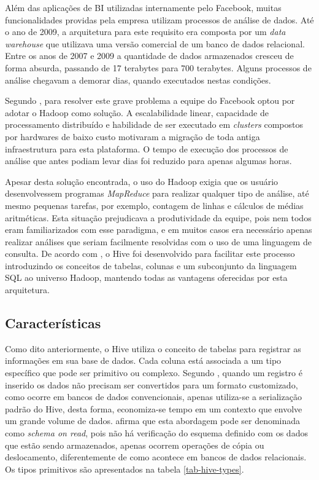 Além das aplicações de BI utilizadas internamente pelo Facebook, muitas funcionalidades providas pela empresa utilizam processos de análise de dados. Até o ano de 2009, a arquitetura para este requisito era composta por um \textit{data warehouse} que utilizava uma versão comercial de um banco de dados relacional. Entre os anos de 2007 e 2009 a quantidade de dados armazenados cresceu de forma absurda, passando de 17 terabytes para 700 terabytes. Alguns processos de análise chegavam a demorar dias, quando executados nestas condições.

Segundo , para resolver este grave problema a equipe do Facebook optou por adotar o Hadoop como solução. A escalabilidade linear, capacidade de processamento distribuído e habilidade de ser executado em \textit{clusters} compostos por hardwares de baixo custo motivaram a migração de toda antiga infraestrutura para esta plataforma. O tempo de execução dos processos de análise que antes podiam levar dias foi reduzido para apenas algumas horas.

Apesar desta solução encontrada, o uso do Hadoop exigia que os usuário desenvolvessem programas \textit{MapReduce} para realizar qualquer tipo de análise, até mesmo pequenas tarefas, por exemplo, contagem de linhas e cálculos de médias aritméticas. Esta situação prejudicava a produtividade da equipe, pois nem todos eram familiarizados com esse paradigma, e em muitos casos era necessário apenas realizar análises que seriam facilmente resolvidas com o uso de uma linguagem de consulta. De acordo com , o Hive foi desenvolvido para facilitar este processo introduzindo os conceitos de tabelas, colunas e um subconjunto da linguagem SQL ao universo Hadoop, mantendo todas as vantagens oferecidas por esta arquitetura.

\subsection{Características}

Como dito anteriormente, o Hive utiliza o conceito de tabelas para registrar as informações em sua base de dados. Cada coluna está associada a um tipo específico que pode ser primitivo ou complexo. Segundo , quando um registro é inserido os dados não precisam ser convertidos para um formato customizado, como ocorre em bancos de dados convencionais, apenas utiliza-se a serialização padrão do Hive, desta forma, economiza-se tempo em um contexto que envolve um grande volume de dados.  afirma que esta abordagem pode ser denominada como \textit{schema on read}, pois não há verificação do esquema definido com os dados que estão sendo armazenados, apenas ocorrem operações de cópia ou deslocamento, diferentemente de como acontece em bancos de dados relacionais. Os tipos primitivos são apresentados na tabela \ref{tab-hive-types}.

